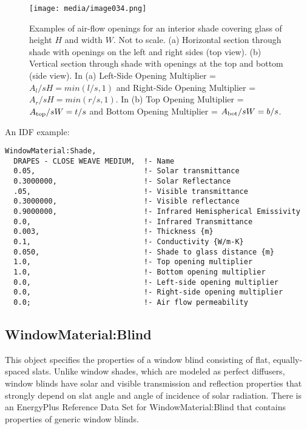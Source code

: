 \begin{figure}[hbtp] %
\centering
\texttt{[image: media/image034.png]}
\caption{Examples of air-flow openings for an interior shade covering glass of height \(H\) and width \(W\). Not to scale. (a) Horizontal section through shade with openings on the left and right sides (top view). (b) Vertical section through shade with openings at the top and bottom (side view). In (a) Left-Side Opening Multiplier = \(A_{l}/sH = min(l/s, 1)\) and Right-Side Opening Multiplier = \(A_{r}/sH = min(r/s, 1)\). In (b) Top Opening Multiplier = \(A_{\rm{top}}/sW = t/s\) and Bottom Opening Multiplier = \(A_{\rm{bot}}/sW = b/s\). \protect \label{fig:examples-of-air-flow-openings-for-an-interior}}
\end{figure}

An IDF example:

\begin{lstlisting}
WindowMaterial:Shade,
  DRAPES - CLOSE WEAVE MEDIUM,  !- Name
  0.05,                         !- Solar transmittance
  0.3000000,                    !- Solar Reflectance
  .05,                          !- Visible transmittance
  0.3000000,                    !- Visible reflectance
  0.9000000,                    !- Infrared Hemispherical Emissivity
  0.0,                          !- Infrared Transmittance
  0.003,                        !- Thickness {m}
  0.1,                          !- Conductivity {W/m-K}
  0.050,                        !- Shade to glass distance {m}
  1.0,                          !- Top opening multiplier
  1.0,                          !- Bottom opening multiplier
  0.0,                          !- Left-side opening multiplier
  0.0,                          !- Right-side opening multiplier
  0.0;                          !- Air flow permeability
\end{lstlisting}

\subsection{WindowMaterial:Blind}\label{windowmaterialblind}

This object specifies the properties of a window blind consisting of flat, equally-spaced slats. Unlike window shades, which are modeled as perfect diffusers, window blinds have solar and visible transmission and reflection properties that strongly depend on slat angle and angle of incidence of solar radiation. There is an EnergyPlus Reference Data Set for WindowMaterial:Blind that contains properties of generic window blinds.

